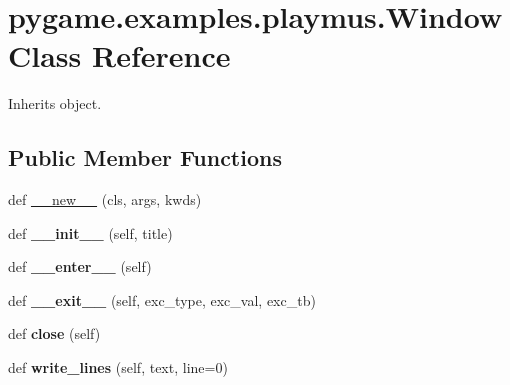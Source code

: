 \hypertarget{classpygame_1_1examples_1_1playmus_1_1_window}{}\section{pygame.\+examples.\+playmus.\+Window Class Reference}
\label{classpygame_1_1examples_1_1playmus_1_1_window}


Inherits object.

\subsection*{Public Member Functions}
\begin{DoxyCompactItemize}
\item 
def \hyperlink{classpygame_1_1examples_1_1playmus_1_1_window_ab80824dac7d8beb35463235d3b48ec82}{\+\_\+\+\_\+new\+\_\+\+\_\+} (cls, args, kwds)
\item 
\mbox{\label{classpygame_1_1examples_1_1playmus_1_1_window_aa7b1b7b1977b7971e99012a284db5bd4}} 
def {\bfseries \+\_\+\+\_\+init\+\_\+\+\_\+} (self, title)
\item 
\mbox{\label{classpygame_1_1examples_1_1playmus_1_1_window_ac1bc295a697f08cdda818a6fb60f64b5}} 
def {\bfseries \+\_\+\+\_\+enter\+\_\+\+\_\+} (self)
\item 
\mbox{\label{classpygame_1_1examples_1_1playmus_1_1_window_a4a1cadb671c42a3473681664be5ea6e3}} 
def {\bfseries \+\_\+\+\_\+exit\+\_\+\+\_\+} (self, exc\+\_\+type, exc\+\_\+val, exc\+\_\+tb)
\item 
\mbox{\label{classpygame_1_1examples_1_1playmus_1_1_window_a99614a7432683a0f852a050508ee1867}} 
def {\bfseries close} (self)
\item 
\mbox{\label{classpygame_1_1examples_1_1playmus_1_1_window_a186507d3117aff923ab34b2b2dbe17eb}} 
def {\bfseries write\+\_\+lines} (self, text, line=0)
\end{DoxyCompactItemize}
